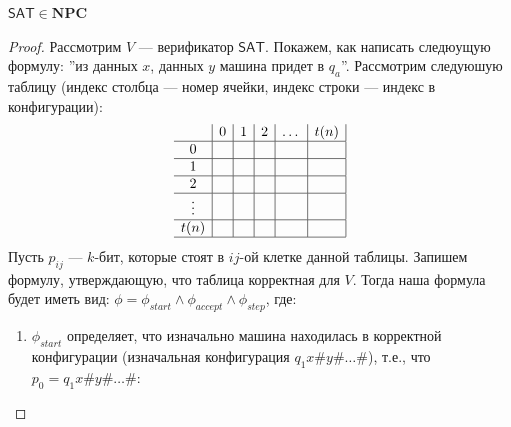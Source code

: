 \begin{theorem}
    \(\mathsf{SAT} \in \mathbf{NPC}\)
\end{theorem}
\begin{proof}
    Рассмотрим \(V\) --- верификатор \(\mathsf{SAT}\). Покажем, как написать следюущую формулу: ''из данных \(x\), данных \(y\) машина придет в \(q_a\)''. Рассмотрим следуюшую таблицу (индекс столбца --- номер ячейки, индекс строки --- индекс в конфигурации):
    \[\begin{array}{c|c|c|c|c|c|}
        & 0 & 1 & 2 & \dots & t(n) \\
        \hline
        0 & & & & & \\
        \hline
        1  & & & & & \\
        \hline
        2  & & & & & \\
        \hline
        \vdots  & & & & & \\
        \hline
        t(n)  & & & & & \\
        \hline
    \end{array}\]
    Пусть \(p_{ij}\) --- \(k\)-бит, которые стоят в \(ij\)-ой клетке данной таблицы. Запишем формулу, утверждающую, что таблица корректная для \(V\). Тогда наша формула будет иметь вид: \(\phi = \phi_{start} \wedge \phi_{accept} \wedge \phi_{step}\), где:
    \begin{enumerate}
        \item \(\phi_{start}\) определяет, что изначально машина находилась в корректной конфигурации (изначальная конфигурация \(q_1 x\#y\#\dots\#\)), т.е., что \(p_0 = q_1 x\#y\#\dots\#\):
        

\end{enumerate}
\end{proof}
